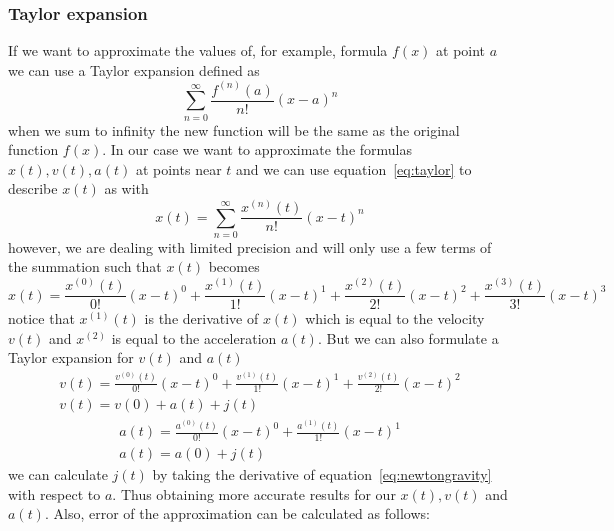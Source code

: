 \documentclass[11pt]{article} %
\begin{document}
\subsubsection{Taylor expansion}
If we want to approximate the values of, for example, formula $f(x)$ at point $a$ we can use a Taylor expansion defined as
\begin{equation}
    \label{eq:taylor}
    \sum^\infty_{n=0} \frac{f^{(n)}(a)}{n!}(x-a)^n
\end{equation}
when we sum to infinity the new function will be the same as the original function $f(x)$. In our case we want to approximate the formulas $x(t), v(t), a(t)$ at points near $t$ and we can use equation~\ref{eq:taylor} to describe $x(t)$ as with 
\begin{equation}
    x(t) = \sum^\infty_{n=0} \frac{x^{(n)}(t)}{n!}(x-t)^n
\end{equation}
however, we are dealing with limited precision and will only use a few terms of the summation such that $x(t)$ becomes
\begin{equation}
    x(t) =  \frac{x^{(0)}(t)}{0!}(x-t)^0 + \frac{x^{(1)}(t)}{1!}(x-t)^1 +\frac{x^{(2)}(t)}{2!}(x-t)^2 +\frac{x^{(3)}(t)}{3!}(x-t)^3
\end{equation}
notice that $x^{(1)}(t)$ is the derivative of $x(t)$ which is equal to the velocity $v(t)$ and $x^{(2)}$ is equal to the acceleration $a(t)$. But we can also formulate a Taylor expansion for $v(t)$ and $a(t)$
\begin{equation}
    \begin{split}
        v(t) =  \frac{v^{(0)}(t)}{0!}(x-t)^0 + \frac{v^{(1)}(t)}{1!}(x-t)^1 +\frac{v^{(2)}(t)}{2!}(x-t)^2\\
        v(t) = v(0) + a(t) + j(t)
    \end{split}
\end{equation}
\begin{equation}
    \begin{split}
        a(t) =  \frac{a^{(0)}(t)}{0!}(x-t)^0 + \frac{a^{(1)}(t)}{1!}(x-t)^1 \\
        a(t) =  a(0) + j(t) 
    \end{split}
\end{equation}
we can calculate $j(t)$ by taking the derivative of equation~\ref{eq:newtongravity} with respect to $a$. Thus obtaining more accurate results for our $x(t), v(t)$ and $a(t)$.
Also, error of the approximation can be calculated as follows:
\end{document}
